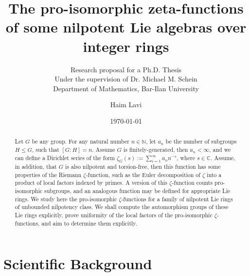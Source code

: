 \documentclass[12pt]{article}
\title{The pro-isomorphic zeta-functions of some nilpotent Lie algebras over integer rings}
\subtitle{Research proposal for a Ph.D. Thesis\\
Under the supervision of Dr. Michael M. Schein\\
Department of Mathematics, Bar-Ilan University}
\author{Haim Lavi}
\date{\today}
\begin{document}
\maketitle
\tableofcontents
\newpage
\begin{abstract}
Let $G$ be any group. For any natural number $n\in\mathbb{N}$, let $a_n$ be the number of subgroups $H\leq G$, such that $[G:H]=n$. Assume $G$ is finitely-generated, then $a_n<\infty$, and we can define a Dirichlet series of the form $\zeta_G(s):=\sum_{i=1}^\infty a_n n^{-s}$, where $s\in\mathbb{C}$. Assume, in addition, that $G$ is also nilpotent and torsion-free, then this function has some properties of the Riemann $\zeta$-function, such as the Euler decomposition of $\zeta$ into a product of local factors indexed by primes. A version of this $\zeta$-function counts pro-isomorphic subgroups, and an analogous function may be defined for appropriate Lie rings. We study here the pro-isomorphic $\zeta$-functions for a family of nilpotent Lie rings of unbounded nilpotency class. We shall compute the automorphism groups of these Lie rings explicitly, prove uniformity of the local factors of the pro-isomorphic $\zeta$-functions, and aim to determine them explicitly.
\end{abstract}
\section{Scientific Background}
\end{document}
